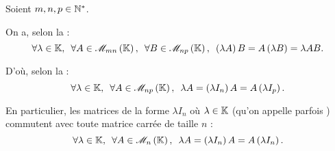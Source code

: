 \begin{rem}
Soient \(m,n,p\in\mathbb{N}^*\).

On a, selon la  : \[\quantifs{\forall\lambda\in\K;\forall A\in\M{mn};\forall B\in\M{np}}\paren{\lambda A}B=A\paren{\lambda B}=\lambda AB.\]

D'où, selon la  : \[\quantifs{\forall\lambda\in\K;\forall A\in\M{np}}\lambda A=\paren{\lambda I_n}A=A\paren{\lambda I_p}.\]

En particulier, les matrices de la forme \(\lambda I_n\) où \(\lambda\in\mathbb{K}\) (qu'on appelle parfois ) commutent avec toute matrice carrée de taille \(n\) : \[\quantifs{\forall\lambda\in\K;\forall A\in\M{n}}\lambda A=\paren{\lambda I_n}A=A\paren{\lambda I_n}.\]
\end{rem}

